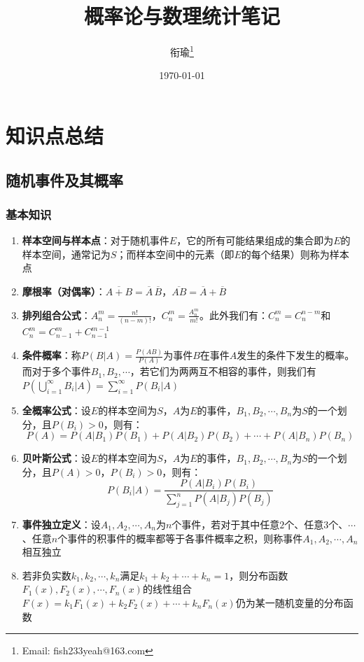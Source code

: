 \documentclass[12pt,a4paper,UTF8]{book}
\begin{document}
\frontmatter
\title{概率论与数理统计笔记}
\author{衔瑜\thanks{Email: fish233yeah@163.com}}
\date{\today}
\maketitle
\tableofcontents



\mainmatter
\setlength{\parindent}{0pt}
\chapter{知识点总结}

\section{随机事件及其概率}
\subsection{基本知识}
\begin{enumerate}
\item \textbf{样本空间与样本点}：对于随机事件$E$，它的所有可能结果组成的集合即为$E$的样本空间，通常记为$S$；而样本空间中的元素（即$E$的每个结果）则称为样本点
\item \textbf{摩根率（对偶率）}：$\overline{A+B}=\overline{A}\,\overline{B}$，$\overline{AB}=\overline{A}+\overline{B}$
\item \textbf{排列组合公式}：$A_n^m=\frac{n!}{\left(n-m\right)!}$，$C_n^m=\frac{A_n^m}{m!}$。此外我们有：$C_n^m=C_n^{n-m}$和$C_n^m=C_{n-1}^m+C_{n-1}^{m-1}$
\item \textbf{条件概率}：称$P\left(B|A\right)=\frac{P\left(AB\right)}{P\left(A\right)}$为事件$B$在事件$A$发生的条件下发生的概率。而对于多个事件$B_1,B_2,\cdots$，若它们为两两互不相容的事件，则我们有$P\left(\bigcup\limits_{i=1}^{\infty}B_i|A\right)=\sum\limits_{i=1}^{\infty}P\left(B_i|A\right)$
\item \textbf{全概率公式}：设$E$的样本空间为$S$，$A$为$E$的事件，$B_1,B_2,\cdots,B_n$为$S$的一个划分，且$P\left(B_i\right)>0$，则有：
\[P\left(A\right)=P\left(A|B_1\right)P\left(B_1\right)+P\left(A|B_2\right)P\left(B_2\right)+\cdots+P\left(A|B_n\right)P\left(B_n\right)\]
\item \textbf{贝叶斯公式}：设$E$的样本空间为$S$，$A$为$E$的事件，$B_1,B_2,\cdots,B_n$为$S$的一个划分，且$P\left(A\right)>0$，$P\left(B_i\right)>0$，则有：
\[P\left(B_i|A\right)=\frac{P\left(A|B_i\right)P\left(B_i\right)}{\sum\limits_{j=1}^nP\left(A|B_j\right)P\left(B_j\right)}\]
\item \textbf{事件独立定义}：设$A_1,A_2,\cdots,A_n$为$n$个事件，若对于其中任意$2$个、任意$3$个、$\cdots$、任意$n$个事件的积事件的概率都等于各事件概率之积，则称事件$A_1,A_2,\cdots,A_n$相互独立
\item 若非负实数$k_1,k_2,\cdots,k_n$满足$k_1+k_2+\cdots+k_n=1$，则分布函数$F_1\left(x\right),F_2\left(x\right),\cdots,F_n\left(x\right)$的线性组合$F\left(x\right)=k_1F_1\left(x\right)+k_2F_2\left(x\right)+\cdots+k_nF_n\left(x\right)$仍为某一随机变量的分布函数
\end{enumerate}
\end{document}
